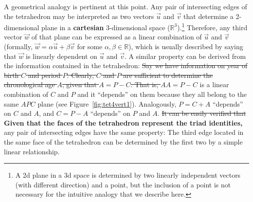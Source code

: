 \documentclass[11pt,oneside,a4paper]{article} %
\newcommand\vt[1]{\textcolor{rd}{#1}}
\begin{document}

A geometrical analogy is pertinent at this point. Any pair of intersecting edges
of the tetrahedron may be interpreted as two vectors $\vec{u}$ and $\vec{v}$
that determine a 2-dimensional plane in a \textbf{cartesian} 3-dimensional
space ($\mathbb{R}^3$).\footnote{A 2d plane in a 3d space is determined by two linearly independent
vectors (with different direction) and a point, but the inclusion of a point is not
necessary for the intuitive analogy that we describe here.} Therefore, any third
vector $\vec{w}$ of that plane can be expressed as a linear combination of
$\vec{u}$ and $\vec{v}$ (formally, $\vec{w}=\alpha\vec{u}+\beta\vec{v}$ for some $\alpha, \beta \in \mathbb{R}$), which is usually
described by saying that $\vec{w}$ is linearly dependent on $\vec{u}$ and
$\vec{v}$.
A similar property can be derived from the information contained in the
tetrahedron: \sout{Say we have information on year of birth $C$ and period $P$. Clearly, $C$ and $P$ are sufficient to determine the chronological age $A$, given that  $A=P-C$. That is, $A$}\textbf{$A=P-C$} is a linear combination of $C$ and $P$ and it ``depends'' on them because they all belong to the same $APC$ plane (see Figure~\ref{fig:tet4vert1}). Analogously, $P=C+A$ ``depends'' on $C$ and $A$, and $C=P-A$ ``depends'' on $P$ and $A$. \sout{It can be easily verified that } \textbf{Given that the faces of the tetrahedron represent the triad identities, } any pair of intersecting edges have the same property: The third edge located in the same face of the tetrahedron can be determined by the first two by a simple linear relationship.
\end{document}
